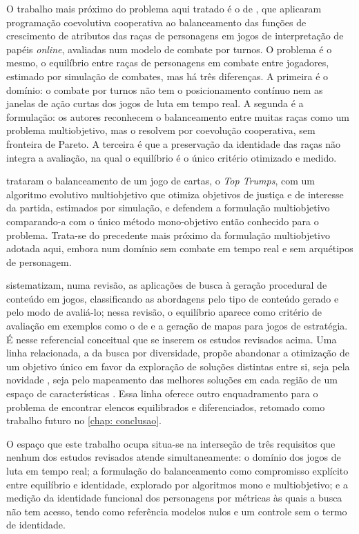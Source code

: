 O trabalho mais próximo do problema aqui tratado é o de , que aplicaram programação coevolutiva cooperativa ao balanceamento das funções de crescimento de atributos das raças de personagens em jogos de interpretação de papéis \textit{online}, avaliadas num modelo de combate por turnos. O problema é o mesmo, o equilíbrio entre raças de personagens em combate entre jogadores, estimado por simulação de combates, mas há três diferenças. A primeira é o domínio: o combate por turnos não tem o posicionamento contínuo nem as janelas de ação curtas dos jogos de luta em tempo real. A segunda é a formulação: os autores reconhecem o balanceamento entre muitas raças como um problema multiobjetivo, mas o resolvem por coevolução cooperativa, sem fronteira de Pareto. A terceira é que a preservação da identidade das raças não integra a avaliação, na qual o equilíbrio é o único critério otimizado e medido.

 trataram o balanceamento de um jogo de cartas, o \textit{Top Trumps}, com um algoritmo evolutivo multiobjetivo que otimiza objetivos de justiça e de interesse da partida, estimados por simulação, e defendem a formulação multiobjetivo comparando-a com o único método mono-objetivo então conhecido para o problema. Trata-se do precedente mais próximo da formulação multiobjetivo adotada aqui, embora num domínio sem combate em tempo real e sem arquétipos de personagem.

 sistematizam, numa revisão, as aplicações de busca à geração procedural de conteúdo em jogos, classificando as abordagens pelo tipo de conteúdo gerado e pelo modo de avaliá-lo; nessa revisão, o equilíbrio aparece como critério de avaliação em exemplos como o de  e a geração de mapas para jogos de estratégia. É nesse referencial conceitual que se inserem os estudos revisados acima. Uma linha relacionada, a da busca por diversidade, propõe abandonar a otimização de um objetivo único em favor da exploração de soluções distintas entre si, seja pela novidade \cite{lehman2011novelty}, seja pelo mapeamento das melhores soluções em cada região de um espaço de características \cite{mouret2015mapelites}. Essa linha oferece outro enquadramento para o problema de encontrar elencos equilibrados e diferenciados, retomado como trabalho futuro no \autoref{chap: conclusao}.

O espaço que este trabalho ocupa situa-se na interseção de três requisitos que nenhum dos estudos revisados atende simultaneamente: o domínio dos jogos de luta em tempo real; a formulação do balanceamento como compromisso explícito entre equilíbrio e identidade, explorado por algoritmos mono e multiobjetivo; e a medição da identidade funcional dos personagens por métricas às quais a busca não tem acesso, tendo como referência modelos nulos e um controle sem o termo de identidade.
